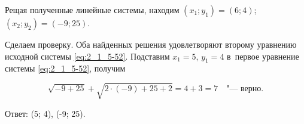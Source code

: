 Рещая полученные линейные системы, находим $(x_{1}; y_{1}) = (6; 4)$;
$(x_{2}; y_{2}) = (-9; 25)$.

Сделаем проверку. Оба найденных решения удовлетворяют второму уравнению
исходной системы \eqref{eq:2_1_5-52}. Подставим $x_{1} = 5$, $y_{1} = 4$
в~первое уравнение системы \eqref{eq:2_1_5-52}, получим

\begin{equation*}
\sqrt{-9 + 25} + \sqrt{2 \cdot (-9) + 25 + 2} = 4 + 3 =7 \quad \text{"--- верно}.
\end{equation*}

Ответ: (5; 4), (-9; 25).

